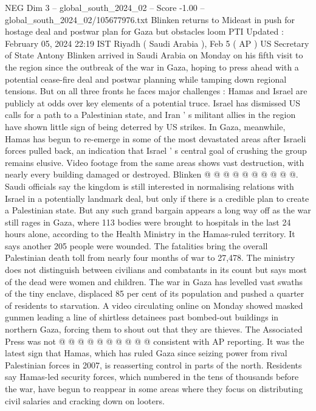 \begin{textsample}{NEG Dim 3 – global\_south\_2024\_02 – Score -1.00 – global\_south\_2024\_02/105677976.txt}  \label{ex:f3_neg_089}
Blinken returns to Mideast in push for hostage deal and postwar plan for Gaza but obstacles loom PTI Updated : February 05, 2024 22:19 IST Riyadh ( Saudi Arabia ), Feb 5 ( AP ) US Secretary of State Antony Blinken arrived in Saudi Arabia on Monday on his fifth visit to the region since the outbreak of the war in Gaza, hoping to press ahead with a potential cease-fire deal and postwar planning while tamping down regional tensions.
But on all three fronts he faces major challenges : Hamas and Israel are publicly at odds over key elements of a potential truce.
Israel has dismissed US calls for a path to a Palestinian state, and Iran ' s militant allies in the region have shown little sign of being deterred by US strikes.
In Gaza, meanwhile, Hamas has begun to re-emerge in some of the most devastated areas after Israeli forces pulled back, an indication that Israel ' s central goal of crushing the group remains elusive.
Video footage from the same areas shows vast destruction, with nearly every building damaged or destroyed.
Blinken @ @ @ @ @ @ @ @ @ @.
Saudi officials say the kingdom is still interested in normalising relations with Israel in a potentially landmark deal, but only if there is a credible plan to create a Palestinian state.
But any such grand bargain appears a long way off as the war still rages in Gaza, where 113 bodies were brought to hospitals in the last 24 hours alone, according to the Health Ministry in the Hamas-ruled territory.
It says another 205 people were wounded.
The fatalities bring the overall Palestinian death toll from nearly four months of war to 27,478.
The ministry does not distinguish between civilians and combatants in its count but says most of the dead were women and children.
The war in Gaza has levelled vast swaths of the tiny enclave, displaced 85 per cent of its population and pushed a quarter of residents to starvation.
A video circulating online on Monday showed masked gunmen leading a line of shirtless detainees past bombed-out buildings in northern Gaza, forcing them to shout out that they are thieves.
The Associated Press was not @ @ @ @ @ @ @ @ @ @ consistent with AP reporting.
It was the latest sign that Hamas, which has ruled Gaza since seizing power from rival Palestinian forces in 2007, is reasserting control in parts of the north.
Residents say Hamas-led security forces, which numbered in the tens of thousands before the war, have begun to reappear in some areas where they focus on distributing civil salaries and cracking down on looters.

\end{textsample}
